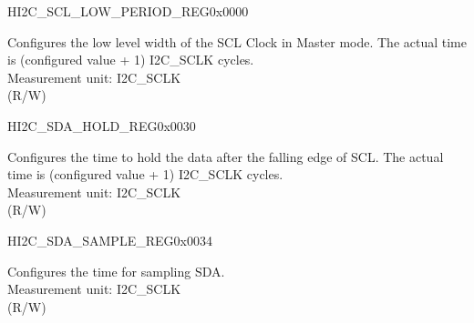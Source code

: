 \begin{register}{H}{I2C\_SCL\_LOW\_PERIOD\_REG}{0x0000}\label{regdesc:I2CSCLLOWPERIODREG}
%
%
\regnewline%
\begin{regdesc}\begin{reglist}
\label{fielddesc:I2CSCLLOWPERIOD}\item [I2C\_SCL\_LOW\_PERIOD] Configures the low level width of the SCL Clock in Master mode. The actual time is (configured value + 1) I2C\_SCLK cycles. \\
Measurement unit: I2C\_SCLK \\ (R/W)
\end{reglist}\end{regdesc}
\end{register}


\begin{register}{H}{I2C\_SDA\_HOLD\_REG}{0x0030}\label{regdesc:I2CSDAHOLDREG}
%
%
\regnewline%
\begin{regdesc}\begin{reglist}
\label{fielddesc:I2CSDAHOLDTIME}\item [I2C\_SDA\_HOLD\_TIME] Configures the time to hold the data after the falling edge of SCL. The actual time is (configured value + 1) I2C\_SCLK cycles.\\
Measurement unit: I2C\_SCLK \\ (R/W)
\end{reglist}\end{regdesc}
\end{register}


\begin{register}{H}{I2C\_SDA\_SAMPLE\_REG}{0x0034}\label{regdesc:I2CSDASAMPLEREG}
%
%
\regnewline%
\begin{regdesc}\begin{reglist}
\label{fielddesc:I2CSDASAMPLETIME}\item [I2C\_SDA\_SAMPLE\_TIME] Configures the time for sampling SDA.\\
Measurement unit: I2C\_SCLK \\ (R/W)
\end{reglist}\end{regdesc}
\end{register}


